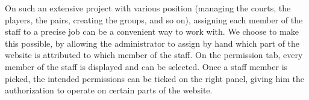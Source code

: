 
On such an extensive project with various position (managing the courts, the players, the pairs, creating the groups, and so on), assigning each member of the staff to a precise job can be a convenient way to work with. We choose to make this possible, by allowing the administrator to assign by hand which part of the website is attributed to which member of the staff. On the permission tab, every member of the staff is displayed and can be selected. Once a staff member is picked, the intended permissions can be ticked on the right panel, giving him the authorization to operate on certain parts of the website.

